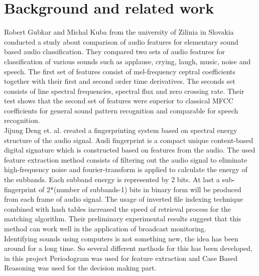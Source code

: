 \section{Background and related work}
Robert Gubkar and Michal Kuba\cite{6566278}  from the university of Zilinia in Slovakia
conducted a study about comparison of audio features for elementary sound
based audio classification. They compared two sets of audio features for classification
of various sounds such as applause, crying, laugh, music, noise and speech.
The first set of features consist of mel-frequency ceptral coefficients together with
their first and second order time derivatives. The seconds set consists of line
spectral frequencies, spectral flux and zero crossing rate. Their test shows that
the second set of features were superior to classical MFCC coefficients for general
sound pattern recognition and comparable for speech recognition.\\

Jijung Deng et. al.\cite{6138136} created a fingerprinting system based on spectral energy
structure of the audio signal. Audi fingerprint is a compact unique content-based
digital signature which is constructed based on features from the audio.
The used feature extraction method consists of filtering out the audio signal
to eliminate high-frequency noise and fourier-transform is applied to calculate
the energy of the subbands. Each subband energy is represented by 2 bits.
At last a sub-fingerprint of 2*(number of subbands-1) bits in binary form will
be produced from each frame of audio signal. The usage of inverted file
indexing technique combined with hash tables increased the speed of retrieval
process for the matching algorithm. Their preliminary experimental results
suggest that this method can work well in the application of broadcast
monitoring.\\


Identifying sounds using computers is not something new, the idea has been
around for a long time. So several different methods for this has been
developed, in this project Periodogram was used for feature extraction and
Case Based Reasoning was used for the decision making part.\\

